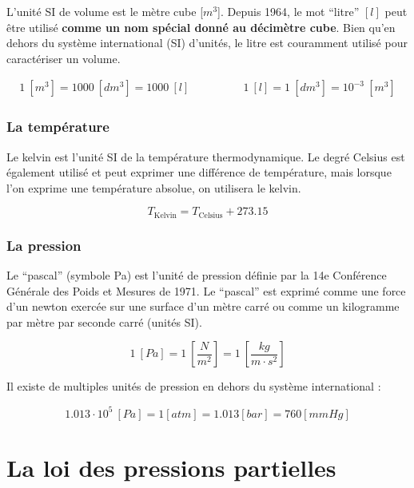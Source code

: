 \documentclass[
  11pt,
  a4paper,
  openany]{book}
\begin{document}
L'unité SI de volume est le mètre cube {[}\(m^3\){]}. Depuis 1964, le mot ``litre'' \([l]\) peut être utilisé \textbf{comme un nom spécial donné au décimètre cube}. Bien qu'en dehors du système international (SI) d'unités, le litre est couramment utilisé pour caractériser un volume.

\[
\begin{split}
  1\ \left[m^3\right] = 1000\ \left[dm^3\right] = 1000\ \left[l\right]
\end{split}
\qquad\qquad
\begin{split}
    1\ \left[l\right] = 1\ \left[dm^3\right] = 10^{-3}\ \left[m^3\right]
\end{split}
\]

\hypertarget{la-tempuxe9rature}{%
\subsubsection{La température}\label{la-tempuxe9rature}}

Le kelvin est l'unité SI de la température thermodynamique. Le degré Celsius est également utilisé et peut exprimer une différence de température, mais lorsque l'on exprime une température absolue, on utilisera le kelvin.

\[
T_{{\mathrm{Kelvin}}}=T_{{\mathrm {Celsius}}} + 273.15
\]

\hypertarget{la-pression}{%
\subsubsection{La pression}\label{la-pression}}

Le ``pascal'' (symbole Pa) est l'unité de pression définie par la 14e Conférence Générale des Poids et Mesures de 1971. Le ``pascal'' est exprimé comme une force d'un newton exercée sur une surface d'un mètre carré ou comme un kilogramme par mètre par seconde carré (unités SI).

\[
1\ \left[Pa\right] = 1\ \left[\frac{N}{m^2}\right] = 1\ \left[\frac{kg}{m \cdot s^2}\right]
\]

Il existe de multiples unités de pression en dehors du système international :

\[
1.013 \cdot 10^{5}\ \left[Pa\right] =
1 \left[atm\right] =
1.013 \left[bar\right] =
760 \left[mmHg\right]
\]

\hypertarget{la-loi-des-pressions-partielles}{%
\section{La loi des pressions partielles}\label{la-loi-des-pressions-partielles}}
\end{document}
